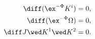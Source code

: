 \begin{equation}
\label{2SU3cond}
\begin{aligned}
   \diff (\ex^{-\Phi}K^i ) & = 0 , \\
   \diff (\ex^{-\Phi}\Omega ) &= 0 , \\
   \diff J \wed K^1 \wed K^2 &= 0 .
\end{aligned}
\end{equation}


